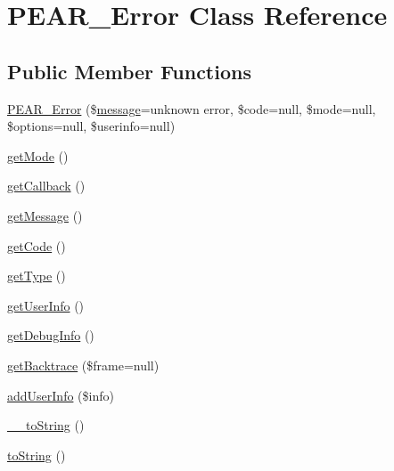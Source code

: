 \hypertarget{classPEAR__Error}{}\section{P\+E\+A\+R\+\_\+\+Error Class Reference}
\label{classPEAR__Error}
\subsection*{Public Member Functions}
\begin{DoxyCompactItemize}
\item 
\hyperlink{classPEAR__Error_a32ede8c5a867a74af0970772eccdebef}{P\+E\+A\+R\+\_\+\+Error} (\$\hyperlink{classmessage}{message}=\textquotesingle{}unknown error\textquotesingle{}, \$code=null, \$mode=null, \$options=null, \$userinfo=null)
\item 
\hyperlink{classPEAR__Error_adf8ebb12d192a152c0f3f80b5ca01e7c}{get\+Mode} ()
\item 
\hyperlink{classPEAR__Error_a8060f0ee49b7346e4ca6e04aa70ae25c}{get\+Callback} ()
\item 
\hyperlink{classPEAR__Error_a00beb48b680580de68477d0f77e27510}{get\+Message} ()
\item 
\hyperlink{classPEAR__Error_a54924b41ab0d14ed7007f3c1b3f0ca82}{get\+Code} ()
\item 
\hyperlink{classPEAR__Error_acebd26397af611328c6a7125cbc6284b}{get\+Type} ()
\item 
\hyperlink{classPEAR__Error_a3933a88dc76b37aace3c333ce91f8560}{get\+User\+Info} ()
\item 
\hyperlink{classPEAR__Error_a33eade09a689fdb4e5a79727fa407f13}{get\+Debug\+Info} ()
\item 
\hyperlink{classPEAR__Error_a7892a046070c977e5fcba9fcb749673d}{get\+Backtrace} (\$frame=null)
\item 
\hyperlink{classPEAR__Error_a229db64a10b64f41644ec19cf3c1e47b}{add\+User\+Info} (\$info)
\item 
\hyperlink{classPEAR__Error_a82c4bf3c440d5b8663b214d799d08d74}{\+\_\+\+\_\+to\+String} ()
\item 
\hyperlink{classPEAR__Error_ae1b052b3d6ae9b74dbc3d348f894b6d2}{to\+String} ()
\end{DoxyCompactItemize}
